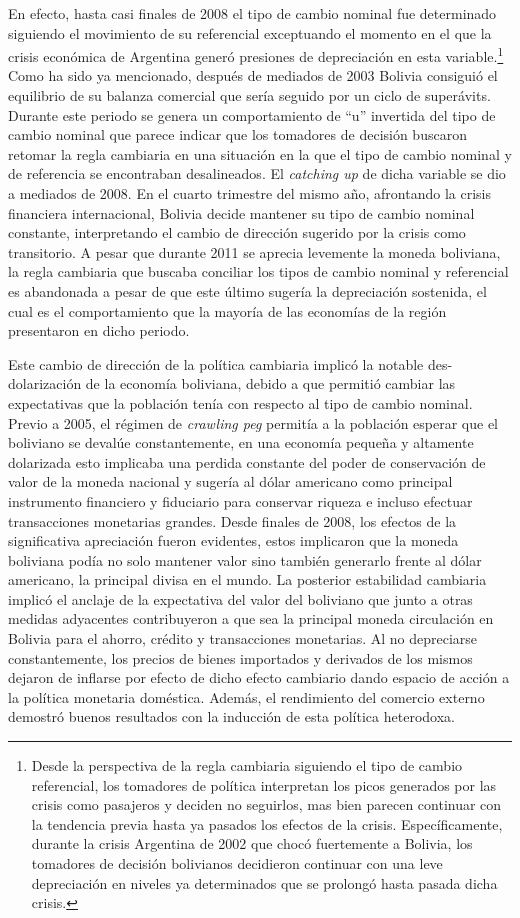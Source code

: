 \documentclass[12pt,letterpaper]{article}
\begin{document}
En efecto, hasta casi finales de 2008 el tipo de cambio nominal fue determinado siguiendo el movimiento de su referencial exceptuando el momento en el que la crisis económica de Argentina generó presiones de depreciación en esta variable.\footnote{Desde la perspectiva de la regla cambiaria siguiendo el tipo de cambio referencial, los tomadores de política interpretan los picos generados por las crisis como pasajeros y deciden no seguirlos, mas bien parecen continuar con la tendencia previa hasta ya pasados los efectos de la crisis. Específicamente, durante la crisis Argentina de 2002 que chocó fuertemente a Bolivia, los tomadores de decisión bolivianos decidieron continuar con una leve depreciación en niveles ya determinados que se prolongó hasta pasada dicha crisis.} Como ha sido ya mencionado, después de mediados de 2003 Bolivia consiguió el equilibrio de su balanza comercial que sería seguido por un ciclo de superávits. Durante este periodo se genera un comportamiento de ``u'' invertida del tipo de cambio nominal que parece indicar que los tomadores de decisión buscaron retomar la regla cambiaria en una situación en la que el tipo de cambio nominal y de referencia se encontraban desalineados. El \emph{catching up} de dicha variable se dio a mediados de 2008. En el cuarto trimestre del mismo año, afrontando la crisis financiera internacional, Bolivia decide mantener su tipo de cambio nominal constante, interpretando el cambio de dirección sugerido por la crisis como transitorio. A pesar que durante 2011 se aprecia levemente la moneda boliviana, la regla cambiaria que buscaba conciliar los tipos de cambio nominal y referencial es abandonada a pesar de que este último sugería la depreciación sostenida, el cual es el comportamiento que la mayoría de las economías de la región presentaron en dicho periodo.

Este cambio de dirección de la política cambiaria implicó la notable des-dolarización de la economía boliviana, debido a que permitió cambiar las expectativas que la población tenía con respecto al tipo de cambio nominal. Previo a 2005, el régimen de \emph{crawling peg} permitía a la población esperar que el boliviano se devalúe constantemente, en una economía pequeña y altamente dolarizada esto implicaba una perdida constante del poder de conservación de valor de la moneda nacional y sugería al dólar americano como principal instrumento financiero y fiduciario para conservar riqueza e incluso efectuar transacciones monetarias grandes. Desde finales de 2008, los efectos de la significativa apreciación fueron evidentes, estos implicaron que la moneda boliviana podía no solo mantener valor sino también generarlo frente al dólar americano, la principal divisa en el mundo. La posterior estabilidad cambiaria implicó el anclaje de la expectativa del valor del boliviano que junto a otras medidas adyacentes contribuyeron a que sea la principal moneda circulación en Bolivia para el ahorro, crédito y transacciones monetarias. Al no depreciarse constantemente, los precios de bienes importados y derivados de los mismos dejaron de inflarse por efecto de dicho efecto cambiario dando espacio de acción a la política monetaria doméstica. Además, el rendimiento del comercio externo demostró buenos resultados con la inducción de esta política heterodoxa.
\end{document}
